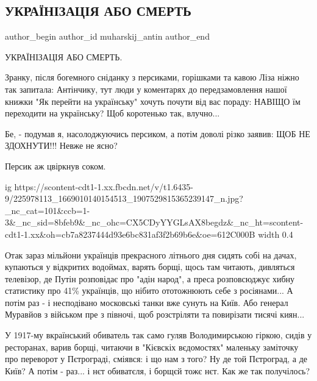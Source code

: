  
 
 
 
 
 
\subsection{УКРАЇНІЗАЦІЯ АБО СМЕРТЬ}
\label{sec:29_07_2021.fb.muharskij_antin.1.ukrainizacia_abo_smert}
 
\ifcmt
 author_begin
   author_id muharskij_antin
 author_end
\fi

УКРАЇНІЗАЦІЯ АБО СМЕРТЬ.

Зранку, після богемного сніданку з персиками, горішками та кавою Ліза ніжно так
запитала: Антінчику, тут люди у коментарях до передзамовлення нашої книжки "Як
перейти на українську" хочуть почути від вас пораду: НАВІЩО їм переходити на
українську? Щоб коротенько так, влучно...

Бе, - подумав я, насолоджуючись персиком, а потім доволі різко заявив: ЩОБ НЕ
ЗДОХНУТИ!!! Невже не ясно?

Персик аж цвіркнув соком. 

\ifcmt
  ig https://scontent-cdt1-1.xx.fbcdn.net/v/t1.6435-9/225978113_1669010140154513_1907529815365239147_n.jpg?_nc_cat=101&ccb=1-3&_nc_sid=8bfeb9&_nc_ohc=CX5CDyYYGLsAX8begdz&_nc_ht=scontent-cdt1-1.xx&oh=cb7a8237444d93e6bc831af3f2b69b6e&oe=612C000B
  width 0.4
\fi

Отак зараз мільйони українців прекрасного літнього дня сидять собі на дачах,
купаються у відкритих водоймах, варять борщі, щось там читають, дивляться
телевізор, де Путін розповідає про "адін народ", а преса розповсюджує хибну
статистику про 41\% українців, що нібито ототожнюють себе з росіянами... А потім
раз - і несподівано московські танки вже сунуть на Київ. Або генерал Муравйов з
військом пре з півночі, щоб розстріляти та повирізати тисячі киян...

У 1917-му вкраїнський обиватель так само гуляв Володимирською гіркою, сидів у
ресторанах, варив борщі, читаючи в "Кієвскіх вєдомостях" маленьку заміточку про
переворот у Пєтрограді, сміявся: і що нам з того? Ну де той Пєтроград, а де
Київ? А потім - раз... і нєт обиватєля, і борщєй тожє нєт. Как же так
получілось?

